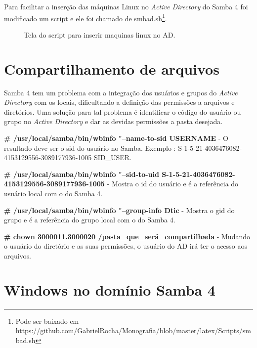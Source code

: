 Para facilitar a inserção das máquinas Linux no \textit{Active Directory} do Samba 4 foi modificado um script e ele foi chamado de smbad.sh\footnote[4]{Pode ser baixado em https://github.com/GabrielRocha/Monografia/blob/master/latex/Scripts/smbad.sh}. 

\begin{figure}[ht]
   	\centering
   	\caption{Tela do script para inserir maquinas linux no AD.}
    \label{smbad}
\end{figure}

\section{Compartilhamento de arquivos}

Samba 4 tem um problema com a integração dos usuários e grupos do \textit{Active Directory} com os locais, dificultando a definição das permissões a arquivos e diretórios. Uma solução para tal problema é identificar o código do usuário ou grupo no \textit{Active Directory} e dar as devidas permissões a pasta desejada.

\noindent \textbf{\# /usr/local/samba/bin/wbinfo "--name-to-sid USERNAME} - O resultado deve ser o sid do usuário no Samba. Exemplo : S-1-5-21-4036476082-4153129556-3089177936-1005 SID\_USER.

\noindent \textbf{\# /usr/local/samba/bin/wbinfo "--sid-to-uid S-1-5-21-4036476082-4153129556-3089177936-1005} - Mostra o id do usuário e é a referência do usuário local com o do Samba 4.

\noindent \textbf{\# /usr/local/samba/bin/wbinfo "--group-info Dtic} - Mostra o gid do grupo e é a referência do grupo local com o do Samba 4.

\noindent \textbf{\# chown 3000011.3000020 /pasta\_que\_será\_compartilhada} - Mudando o usuário do diretório e as suas permissões, o usuário do AD irá ter o acesso aos arquivos.

\section{Windows no domínio Samba 4}

